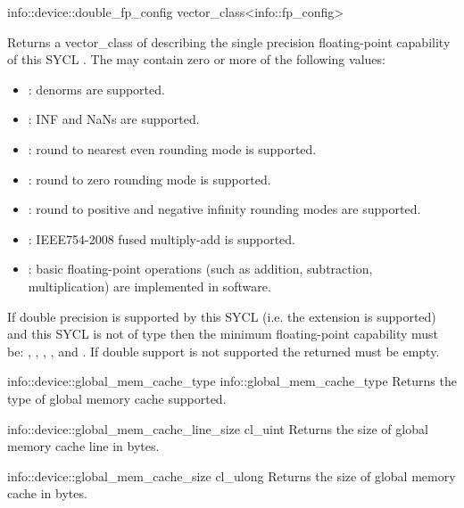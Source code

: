   \addInfoRow
  {info::device::double_fp_config}
  {vector_class<info::fp_config>}
  {
  Returns a vector_class of  describing the single precision floating-point capability of this SYCL . The  may contain zero or more of the following values:
  \begin{itemize}
    \item {}: denorms are
    supported.
    \item {}: INF and NaNs are
    supported.
    \item {}: round to
    nearest even rounding mode is supported.
    \item {}: round to
    zero rounding mode is supported.
    \item {}: round to
    positive and negative infinity rounding modes are supported.
    \item {}: IEEE754-2008 fused
    multiply-add is supported.
    \item {}: basic
    floating-point operations (such as addition, subtraction, multiplication) are implemented in software.
  \end{itemize}
  If double precision is supported by this SYCL  (i.e. the  extension is supported) and this SYCL  is not of type  then the minimum floating-point capability must be:
  , , , ,  and . If double support is not supported the returned  must be empty.
  }

  \addInfoRow
  {info::device::global_mem_cache_type}
  {info::global_mem_cache\-_type}
  { 
    Returns the type of global memory cache supported.
  }

  \addInfoRow
  {info::device::global_mem_cache_line_size}
  {cl_uint}
  {
    Returns the size of global memory cache line in bytes.
  }

  \addInfoRow
  {info::device::global_mem_cache_size}
  {cl_ulong}
  {Returns the size of global memory cache in bytes.}

